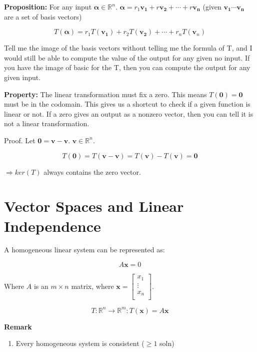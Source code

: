 \documentclass[
]{article}
\begin{document}
\textbf{Proposition:} For any input
$\mathbf{\alpha} \in \mathbb{R}^{n}\text{.\ }\mathbf{\alpha} = r_{1}\mathbf{v_{1}} + r\mathbf{v_{2}} + \cdots + r\mathbf{v_{n}}$
(given $\mathbf{v_{1}}\cdots\mathbf{v_{n}}$ are a set of basis
vectors)

$$T\left( \mathbf{\alpha} \right) = r_{1}T\left( \mathbf{v_{1}} \right) + r_{2}T\left( \mathbf{v_{2}} \right) + \cdots + r_{n}T\left( {\mathbf{v}}_{n} \right)$$

Tell me the image of the basis vectors without telling me the formula of
T, and I would still be able to compute the value of the output for any
given no input. If you have the image of basic for the T, then you can
compute the output for any given input.

\textbf{Property:} The linear transformation must fix a zero. This means
$T\left( \mathbf{0} \right) = \mathbf{0}$ must be in the
codomain. This gives us a shortcut to check if a given function is
linear or not. If a zero gives an output as a nonzero vector, then you
can tell it is not a linear transformation.

Proof. Let
$\mathbf{0} = \mathbf{v} - \mathbf{v}\text{.\ }\mathbf{v} \in \mathbb{R}^{n}$.

$$T\left( \mathbf{0} \right) = T\left( \mathbf{v} - \mathbf{v} \right) = T\left( \mathbf{v} \right) - T\left( \mathbf{v} \right) = \mathbf{0}$$

$\Rightarrow ker(T)$ always contains the zero vector.


\section{Vector Spaces and Linear
Independence}

A homogeneous linear system can be represented as:

$$A\mathbf{x} = 0$$

Where $A$ is an $m \times n$ matrix, where
$\mathbf{x} = \begin{bmatrix}
x_{1} \\
 \vdots \\
x_{n} \\
\end{bmatrix}$.

$$T:\mathbb{R}^{n} \rightarrow \mathbb{R}^{m}:T\left( \mathbf{x} \right) = A\mathbf{x}
$$

\textbf{Remark}

\begin{enumerate}
\def\labelenumi{\arabic{enumi}.}
\item
  Every homogeneous system is consistent ($\geq 1$ soln)
\end{enumerate}
\end{document}
